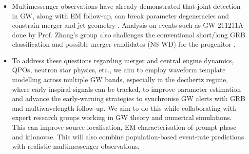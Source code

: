 \subsubsection*{\fontsize{11.5 pt}{10 pt}\selectfont{Gravitational-Wave Counterparts : 
}}
\begin{itemize}
    \itemsep0em 
    \item Multimessenger observations have already demonstrated that joint detection in GW, along with EM follow-up, can break parameter degeneracies and constrain merger and jet geometry \cite{Gianfagna_2023}.  Analysis on events such as GW 211211A done by Prof. Zhang’s group also challenges the conventional short/long GRB classification and possible merger candidates (NS-WD) for the progenitor \cite{Yin_2023}. 
    \item To address these questions regarding merger and central engine dynamics, QPOs, neutron star physics, etc., we aim to employ waveform template modelling across multiple GW bands, especially in the decihertz regime, where early inspiral signals can be tracked, to improve parameter estimation and advance the early-warning strategies to synchronise GW alerts with GRB and multiwavelength follow-up. We aim to do this while collaborating with expert research groups working in GW theory and numerical simulations. This can improve source localisation, EM characterisation of prompt phase and kilonovae. This will also combine population-based event-rate predictions with realistic multimessenger observations.
\end{itemize}

\subsubsection*{\fontsize{11.5 pt}{10 pt}\selectfont{Hadronic Signatures:}}

